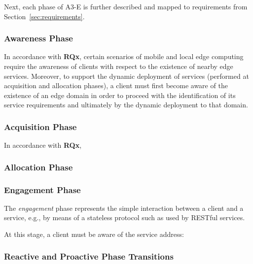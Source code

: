 Next, each phase of A3-E is further described and mapped to requirements from Section~\ref{sec:requirements}.

\subsubsection{Awareness Phase}\label{sec:A3-E-awareness}

In accordance with \textbf{RQx}, certain scenarios of mobile and local edge computing require the awareness of clients with respect to the existence of nearby edge services. Moreover, to support the dynamic deployment of services (performed at acquisition and allocation phases), a client must first become aware of the existence of an edge domain in order to proceed with the identification of its service requirements and ultimately by the dynamic deployment to that domain. 

\subsubsection{Acquisition Phase}\label{sec:A3-E-acquisition}

In accordance with \textbf{RQx}, 

\subsubsection{Allocation Phase}\label{sec:A3-E-allocation}

\subsubsection{Engagement Phase}\label{sec:A3-E-engagement}

The \textit{engagement} phase represents the simple interaction between a client and a service, e.g., by means of a stateless protocol such as used by RESTful services. 

At this stage, a client must be aware of the service address: 

\subsubsection{Reactive and Proactive Phase Transitions}

